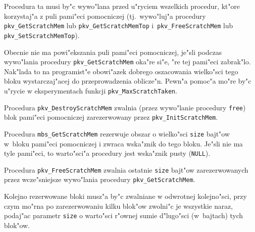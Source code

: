 Procedura ta musi by"c wywo"lana przed u"ryciem wszelkich procedur,
kt"ore korzystaj"a z puli pami"eci pomocniczej (tj.\
wywo"luj"a procedury \texttt{pkv\_GetScratchMem} lub
\texttt{pkv\_GetScratchMemTop}
i~\texttt{pkv\_FreeScratchMem} lub \texttt{pkv\_SetScratchMemTop}).

Obecnie nie ma powi"ekszania puli pami"eci pomocniczej, je"sli podczas
wywo"lania procedury \texttt{pkv\_GetScratchMem} oka"re si"e, "re tej pami"eci
zabrak"lo. Nak"lada to na programist"e obowi"azek dobrego oszacowania
wielko"sci tego bloku wystarczaj"acej do przeprowadzenia oblicze"n.
Pewn"a pomoc"a mo"re by"c u"rycie w eksperymentach funkcji
\texttt{pkv\_MaxScratchTaken}.

\vspace{\bigskipamount}
Procedura \texttt{pkv\_DestroyScratchMem} zwalnia (przez wywo"lanie
procedury \texttt{free}) blok pami"eci pomocniczej zarezerwowany przez
\texttt{pkv\_InitScratchMem}.

\vspace{\bigskipamount}
\begin{sloppypar}
Procedura \texttt{mbs\_GetScratchMem} rezerwuje obszar o wielko"sci
\texttt{size} bajt"ow w~blo\-ku pami"eci pomocniczej i zwraca wska"znik do
tego bloku. Je"sli nie ma tyle pami"eci, to warto"sci"a procedury jest
wska"znik pusty (\texttt{NULL}).
\end{sloppypar}

\vspace{\bigskipamount}
Procedura \texttt{pkv\_FreeScratchMem} zwalnia ostatnie \texttt{size}
bajt"ow zarezerwowanych przez wcze"sniejsze wywo"lania procedury 
\texttt{pkv\_GetScratchMem}.

Kolejno rezerwowane bloki musz"a by"c zwalniane w odwrotnej kolejno"sci,
przy czym mo"rna po zarezerwowaniu kilku blok"ow zwolni"c je wszystkie naraz,
podaj"ac parametr \texttt{size} o warto"sci r"ownej sumie d"lugo"sci
(w~bajtach) tych blok"ow.

